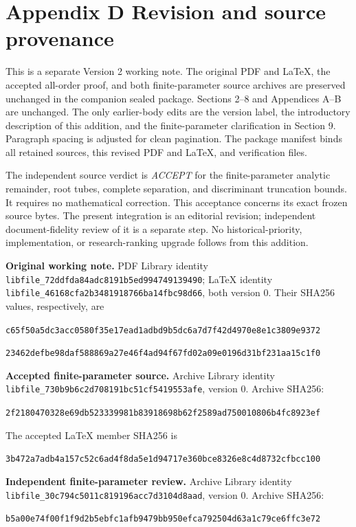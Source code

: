 \documentclass[
  11pt,
]{article}
\begin{document}
\clearpage
\section{Appendix D Revision and source provenance}

This is a separate Version 2 working note. The original PDF and LaTeX,
the accepted all-order proof, and both finite-parameter source archives
are preserved unchanged in the companion sealed package. Sections 2--8
and Appendices A--B are unchanged. The only earlier-body edits are the
version label, the introductory description of this addition, and the
finite-parameter clarification in Section 9. Paragraph spacing is adjusted
for clean pagination. The package manifest binds
all retained sources, this revised PDF and LaTeX, and verification files.

The independent source verdict is \emph{ACCEPT} for the finite-parameter
analytic remainder, root tubes, complete separation, and discriminant
truncation bounds. It requires no mathematical correction. This
acceptance concerns its exact frozen source bytes. The present
integration is an editorial revision; independent document-fidelity
review of it is a separate step. No historical-priority, implementation,
or research-ranking upgrade follows from this addition.

\textbf{Original working note.} PDF Library identity
\nolinkurl{libfile_72ddfda84adc8191b5ed994749139490}; LaTeX identity
\nolinkurl{libfile_46168cfa2b3481918766ba14fbc98d66}, both version 0.
Their SHA256 values, respectively, are

\nolinkurl{c65f50a5dc3acc0580f35e17ead1adbd9b5dc6a7d7f42d4970e8e1c3809e9372}

\nolinkurl{23462defbe98daf588869a27e46f4ad94f67fd02a09e0196d31bf231aa15c1f0}

\textbf{Accepted finite-parameter source.} Archive Library identity
\nolinkurl{libfile_730b9b6c2d708191bc51cf5419553afe}, version 0.
Archive SHA256:

\nolinkurl{2f2180470328e69db523339981b83918698b62f2589ad750010806b4fc8923ef}

The accepted LaTeX member SHA256 is

\nolinkurl{3b472a7adb4a157c52c6ad4f8da5e1d94717e360bce8326e8c4d8732cfbcc100}

\textbf{Independent finite-parameter review.} Archive Library identity
\nolinkurl{libfile_30c794c5011c819196acc7d3104d8aad}, version 0.
Archive SHA256:

\nolinkurl{b5a00e74f00f1f9d2b5ebfc1afb9479bb950efca792504d63a1c79ce6ffc3e72}
\end{document}
